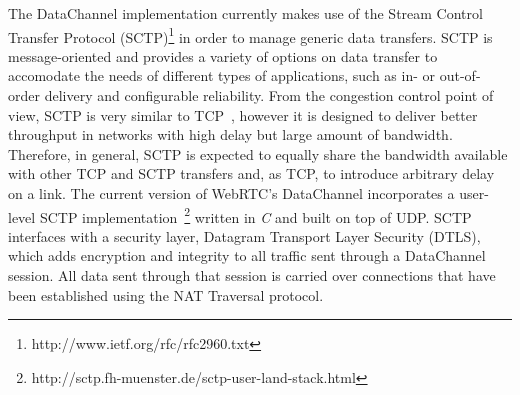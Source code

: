 \documentclass{sig-alternate}
\begin{document}
The DataChannel implementation currently makes use of the Stream Control Transfer Protocol
(SCTP)\footnote{http://www.ietf.org/rfc/rfc2960.txt} in order to manage generic data transfers. SCTP is message-oriented
and provides a variety of options on data transfer to accomodate the needs of different
types of applications, such as in- or out-of-order delivery and configurable reliability.
From the congestion control point of view, SCTP is very similar to TCP~\cite{htcp},
however it is designed to deliver better throughput in networks with high delay but large
amount of bandwidth. Therefore, in general, SCTP is expected to equally share the
bandwidth available with other TCP and SCTP transfers and, as TCP, to introduce arbitrary
delay on a link. The current version of WebRTC's DataChannel incorporates a user-level SCTP
implementation~\footnote{http://sctp.fh-muenster.de/sctp-user-land-stack.html} written in
\textit{C} and built on top of UDP. SCTP interfaces with a security layer, Datagram
Transport Layer Security (DTLS), which adds encryption and integrity to all traffic sent
through a DataChannel session. All data sent through that session is carried over
connections that have been established using the NAT Traversal protocol.


\end{document}

